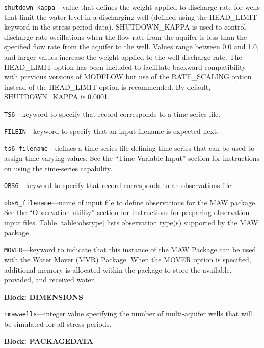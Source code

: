 \begin{description}
\item \texttt{shutdown\_kappa}---value that defines the weight applied to discharge rate for wells that limit the water level in a discharging well (defined using the HEAD\_LIMIT keyword in the stress period data). SHUTDOWN\_KAPPA is used to control discharge rate oscillations when the flow rate from the aquifer is less than the specified flow rate from the aquifer to the well. Values range between 0.0 and 1.0, and larger values increase the weight applied to the well discharge rate. The HEAD\_LIMIT option has been included to facilitate backward compatibility with previous versions of MODFLOW but use of the RATE\_SCALING option instead of the HEAD\_LIMIT option is recommended. By default, SHUTDOWN\_KAPPA is 0.0001.

\item \texttt{TS6}---keyword to specify that record corresponds to a time-series file.

\item \texttt{FILEIN}---keyword to specify that an input filename is expected next.

\item \texttt{ts6\_filename}---defines a time-series file defining time series that can be used to assign time-varying values. See the ``Time-Variable Input'' section for instructions on using the time-series capability.

\item \texttt{OBS6}---keyword to specify that record corresponds to an observations file.

\item \texttt{obs6\_filename}---name of input file to define observations for the MAW package. See the ``Observation utility'' section for instructions for preparing observation input files. Table \ref{table:obstype} lists observation type(s) supported by the MAW package.

\item \texttt{MOVER}---keyword to indicate that this instance of the MAW Package can be used with the Water Mover (MVR) Package.  When the MOVER option is specified, additional memory is allocated within the package to store the available, provided, and received water.

\end{description}
\item \textbf{Block: DIMENSIONS}

\begin{description}
\item \texttt{nmawwells}---integer value specifying the number of multi-aquifer wells that will be simulated for all stress periods.

\end{description}
\item \textbf{Block: PACKAGEDATA}

